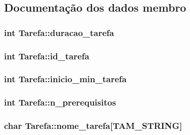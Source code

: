 \subsection{Documentação dos dados membro}
\hypertarget{structTarefa_a7962bef326f487f4ffa7dc0f04153729}{
\subsubsection[{duracao\-\_\-tarefa}]{\setlength{\rightskip}{0pt plus 5cm}int Tarefa\-::duracao\-\_\-tarefa}}\label{structTarefa_a7962bef326f487f4ffa7dc0f04153729}
\hypertarget{structTarefa_a1509b75b75f758e2d0502df4162366f2}{
\subsubsection[{id\-\_\-tarefa}]{\setlength{\rightskip}{0pt plus 5cm}int Tarefa\-::id\-\_\-tarefa}}\label{structTarefa_a1509b75b75f758e2d0502df4162366f2}
\hypertarget{structTarefa_a7d09c30d0162c55a0aab1ad71716fae6}{
\subsubsection[{inicio\-\_\-min\-\_\-tarefa}]{\setlength{\rightskip}{0pt plus 5cm}int Tarefa\-::inicio\-\_\-min\-\_\-tarefa}}\label{structTarefa_a7d09c30d0162c55a0aab1ad71716fae6}
\hypertarget{structTarefa_a9f6369cef91f4b9d544d9e1be0bc705f}{
\subsubsection[{n\-\_\-prerequisitos}]{\setlength{\rightskip}{0pt plus 5cm}int Tarefa\-::n\-\_\-prerequisitos}}\label{structTarefa_a9f6369cef91f4b9d544d9e1be0bc705f}
\hypertarget{structTarefa_a43c0db59f4e6a3031ef2a5951ad8910f}{
\subsubsection[{nome\-\_\-tarefa}]{\setlength{\rightskip}{0pt plus 5cm}char Tarefa\-::nome\-\_\-tarefa\mbox{[}{\bf T\-A\-M\-\_\-\-S\-T\-R\-I\-N\-G}\mbox{]}}}\label{structTarefa_a43c0db59f4e6a3031ef2a5951ad8910f}

